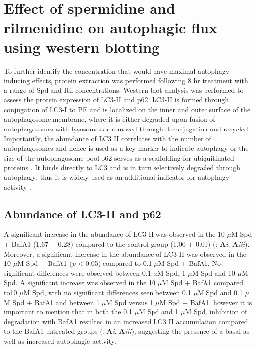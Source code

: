 {\section{Effect of spermidine and rilmenidine on autophagic flux using western blotting}
To further identify the concentration that would have maximal autophagy inducing effects, protein extraction was performed following 8 hr treatment with a range of Spd and Ril concentrations. Western blot analysis was performed to assess the protein expression of LC3-II and p62. LC3-II is formed through conjugation of LC3-I to PE and is localized on the inner and outer surface of the autophagosome membrane, where it is either degraded upon fusion of autophagosomes with lysosomes or removed through deconjugation and recycled \citep{kabeya2000}. Importantly, the abundance of LC3 II correlates with the number of autophagosomes and hence is used as a key marker to indicate autophagy or the size of the autophagosome pool \citep{loos2014} p62 serves as a scaffolding for ubiquitinated proteins \citep{sahani2014}. It binds directly to LC3 and is in turn selectively degraded through autophagy; thus it is widely used as an additional indicator for autophagy activity \citep{pankiv2007}.

\subsection{Abundance of LC3-II and p62}
A significant increase in the abundance of LC3-II was observed in the 10 $\mu$M Spd + BafA1 (1.67 $\pm$ 0.28) compared to the control group (1.00 $\pm$ 0.00) (: \textbf{A}\textit{i}, \textbf{A}\textit{iii}). Moreover, a significant increase in the abundance of LC3-II was observed in the 10 $\mu$M Spd + BafA1 (\textit{p} < 0.05) compared to 0.1 $\mu$M Spd + BafA1. No significant differences were observed between 0.1 $\mu$M Spd, 1 $\mu$M Spd and 10 $\mu$M Spd. A significant increase was observed in the 10 $\mu$M Spd + BafA1 compared to10 $\mu$M Spd, with no significant differences seen between 0.1 $\mu$M Spd and 0.1 $\mu$M Spd + BafA1 and between 1 $\mu$M Spd versus 1 $\mu$M Spd + BafA1, however it is important to mention that in both the 0.1 $\mu$M Spd  and 1 $\mu$M Spd, inhibition of degradation with BafA1 resulted in an increased LC3 II accumulation compared to the BafA1 untreated groups (: \textbf{A}\textit{i}, \textbf{A}\textit{iii}), suggesting the presence of a basal as well as increased autophagic activity.

}
